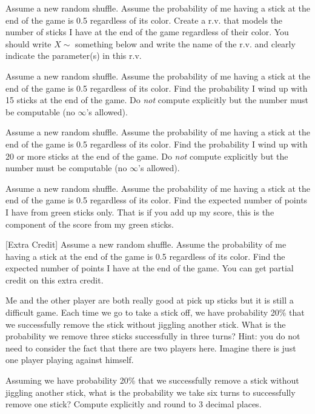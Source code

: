\documentclass[12pt]{article}
\begin{document}
 Assume a new random shuffle. Assume the probability of me having a stick at the end of the game is 0.5 regardless of its color. Create a r.v. that models the number of sticks I have at the end of the game regardless of their color. You should write $X \sim$ something below and write the name of the r.v. and clearly indicate the parameter(s) in this r.v. 

 Assume a new random shuffle. Assume the probability of me having a stick at the end of the game is 0.5 regardless of its color. Find the probability I wind up with 15 sticks at the end of the game. Do \textit{not} compute explicitly but the number must be computable (no $\infty$'s allowed).  

 Assume a new random shuffle. Assume the probability of me having a stick at the end of the game is 0.5 regardless of its color. Find the probability I wind up with 20 or more sticks at the end of the game. Do \textit{not} compute explicitly but the number must be computable (no $\infty$'s allowed). 

 Assume a new random shuffle. Assume the probability of me having a stick at the end of the game is 0.5 regardless of its color. Find the expected number of points I have from green sticks only. That is if you add up my score, this is the component of the score from my green sticks. 

 [Extra Credit] Assume a new random shuffle. Assume the probability of me having a stick at the end of the game is 0.5 regardless of its color. Find the expected number of points I have at the end of the game. You can get partial credit on this extra credit.  

 Me and the other player are both really good at pick up sticks but it is still a difficult game. Each time we go to take a stick off, we have probability 20\% that we successfully remove the stick without jiggling another stick. What is the probability we remove three sticks successfully in three turns? Hint: you do not need to consider the fact that there are two players here. Imagine there is just one player playing against himself. 

 Assuming we have probability 20\% that we successfully remove a stick without jiggling another stick, what is the probability we take six turns to successfully remove one stick? Compute explicitly and round to 3 decimal places. 
\end{document}
